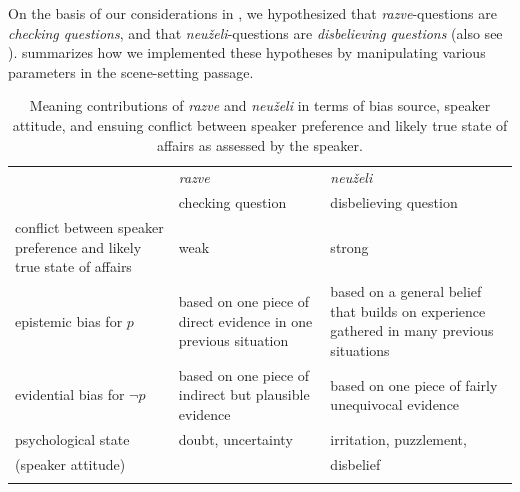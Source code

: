 \documentclass[output=paper,colorlinks,citecolor=brown]{langscibook}
\begin{document}
On the basis of our considerations in , we hypothesized that \textit{razve}-questions are \textit{checking questions}, and that \textit{neuželi}-questions are \textit{disbelieving questions} (also see ).  summarizes how we implemented these hypotheses by manipulating various parameters in the scene-setting passage. 

\begin{table}
\begin{tabularx}{\textwidth}{L{4.25cm}L{3.5cm}L{3.5cm}}
\lsptoprule
& \phantom{checki}\textit{razve} & \phantom{disbelie}\textit{neuželi} \\
& checking question & disbelieving question \\
\midrule 
conflict between speaker preference and likely true state of affairs & \phantom{checki}weak & \phantom{disbelie}strong \\
\midrule 
epistemic bias for $p$ & based on one piece of direct evidence in one previous situation & based on a general belief that builds on experience gathered in many previous situations \\
\midrule 
evidential bias for $\neg p$ & based on one piece of indirect but plausible evidence & based on one piece of fairly unequivocal evidence\\
\midrule
psychological state & doubt, uncertainty & irritation, puzzlement,\\
(speaker attitude) & & disbelief\\
\lspbottomrule
\end{tabularx}
\caption{Meaning contributions of \textit{razve} and \textit{neuželi} in terms of bias source, speaker attitude, and ensuing conflict between speaker preference and likely true state of affairs as assessed by the speaker.}\label{tab:05:7}
\end{table}
\end{document}
